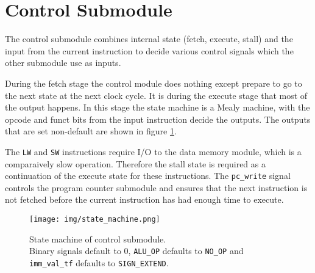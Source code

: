 \section{Control Submodule}
The control submodule combines internal state (fetch, execute, stall) and the input from the current instruction to decide various control signals which the other submodule use as inputs.

During the fetch stage the control module does nothing except prepare to go to the next state at the next clock cycle.
It is during the execute stage that most of the output happens.
In this stage the state machine is a Mealy machine,
with the opcode and funct bits from the input instruction decide the outputs.
The outputs that are set non-default are shown in figure \ref{fig:state_machine}.

The \texttt{LW} and \texttt{SW} instructions require I/O to the data memory module,
which is a comparaively slow operation.
Therefore the stall state is required as a continuation of the execute state for these instructions.
The \texttt{pc\_write} signal controls the program counter submodule and ensures that the next instruction is not fetched before the current instruction has had enough time to execute.

\begin{figure}[h]
    \centering
    \texttt{[image: img/state\_machine.png]}
    \caption{State machine of control submodule.\\Binary signals default to 0, \texttt{ALU\_OP} defaults to \texttt{NO\_OP} and \texttt{imm\_val\_tf} defaults to \texttt{SIGN\_EXTEND}.}
    \label{fig:state_machine}
\end{figure}


